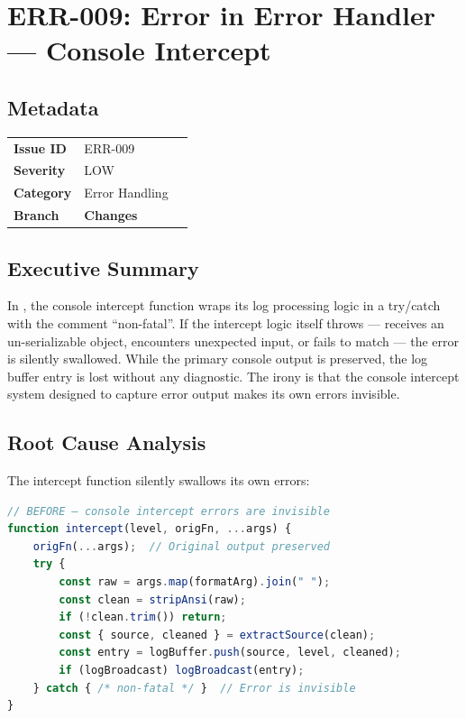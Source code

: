 \section{ERR-009: Error in Error Handler — Console Intercept}
\label{sec:err-009}
\subsection*{Metadata}
\begin{tabular}{ll}
\textbf{Issue ID} & ERR-009 \\
\textbf{Severity} & LOW \\
\textbf{Category} & Error Handling \\
\textbf{Branch} & 
\textbf{Changes} &  \\
\end{tabular}

\subsection*{Executive Summary}
In , the console intercept function wraps its log processing logic in a try/catch with the comment ``non-fatal''. If the intercept logic itself throws —  receives an un-serializable object,  encounters unexpected input, or  fails to match — the error is silently swallowed. While the primary console output is preserved, the log buffer entry is lost without any diagnostic. The irony is that the console intercept system designed to capture error output makes its own errors invisible.

\subsection*{Root Cause Analysis}
The intercept function silently swallows its own errors:

\begin{lstlisting}[language=TypeScript]
// BEFORE — console intercept errors are invisible
function intercept(level, origFn, ...args) {
    origFn(...args);  // Original output preserved
    try {
        const raw = args.map(formatArg).join(" ");
        const clean = stripAnsi(raw);
        if (!clean.trim()) return;
        const { source, cleaned } = extractSource(clean);
        const entry = logBuffer.push(source, level, cleaned);
        if (logBroadcast) logBroadcast(entry);
    } catch { /* non-fatal */ }  // Error is invisible
}
\end{lstlisting}

